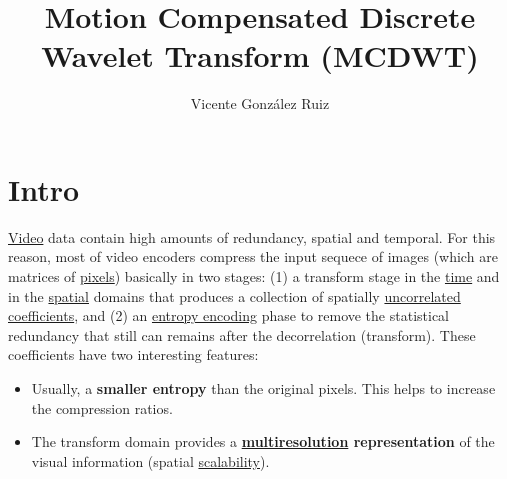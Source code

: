 
\title{Motion Compensated Discrete Wavelet Transform (MCDWT)}

\author{Vicente González Ruiz}

\maketitle
\tableofcontents

\section{Intro}

\href{https://en.wikipedia.org/wiki/Video}{Video} data contain high
amounts of redundancy, spatial and temporal. For this reason, most of
video encoders compress the input sequece of images (which are
matrices of \href{https://en.wikipedia.org/wiki/Pixel}{pixels})
basically in two stages: (1) a transform stage in the
\href{https://en.wikipedia.org/wiki/Time_domain}{time} and in the
\href{https://www.quora.com/What-is-spatial-domain-in-image-processing}{spatial}
domains that produces a collection of spatially
\href{https://en.wikipedia.org/wiki/Decorrelation}{uncorrelated}
\href{https://www.quora.com/What-is-spatial-domain-in-image-processing}{coefficients},
and (2) an
\href{https://vicente-gonzalez-ruiz.github.io/symbol_compression/}{entropy
  encoding} phase to remove the statistical redundancy that still can
remains after the decorrelation (transform). These coefficients have
two interesting features:
\begin{itemize}
\item Usually, a \textbf{smaller entropy} than the original
  pixels. This helps to increase the compression ratios.
\item The transform domain provides a
  \textbf{\href{https://en.wikipedia.org/wiki/Image_resolution}{multiresolution}
    representation} of the visual information (spatial
  \href{http://inst.eecs.berkeley.edu/~ee290t/sp04/lectures/videowavelet_UCB1-3.pdf}{scalability}).
\end{itemize}

